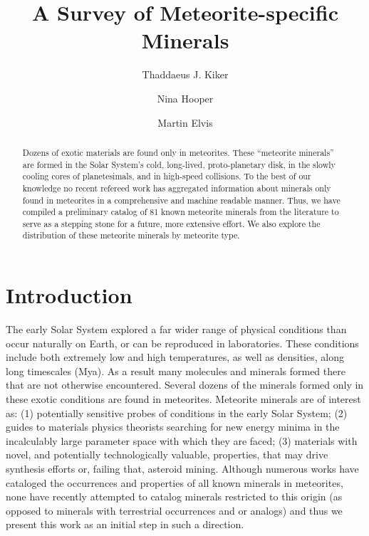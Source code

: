 \documentclass[]{aastex63}
\begin{document}
\title{A Survey of Meteorite-specific Minerals}

\author{Thaddaeus J. Kiker}

\author{Nina Hooper}

\author{Martin Elvis}



\begin{abstract}
Dozens of exotic materials are found only in meteorites. These “meteorite minerals” are formed in the Solar System’s cold, long-lived, proto-planetary disk, in the slowly cooling cores of planetesimals, and in high-speed collisions. To the best of our knowledge no recent refereed work has aggregated information about minerals only found in meteorites in a comprehensive and machine readable manner. Thus, we have compiled a preliminary catalog of 81 known meteorite minerals from the literature to serve as a stepping stone for a future, more extensive effort. We also explore the distribution of these meteorite minerals by meteorite type.  

\end{abstract}

\section{Introduction} \label{sec:intro}

The early Solar System explored a far wider range of physical conditions than occur naturally
on Earth, or can be reproduced in laboratories. These conditions include both extremely low and high temperatures, as well as densities, along long timescales (Mya). As
a result many molecules and minerals formed there that are not otherwise encountered. Several
dozens of the minerals formed only in these exotic conditions are found in meteorites. 
Meteorite minerals are of interest as: (1) potentially sensitive probes of conditions in the early Solar System; (2) guides to materials physics theorists searching for new energy minima in the
incalculably large parameter space with which they are faced; (3) materials with novel, and
potentially technologically valuable, properties, that may drive synthesis efforts or, failing that,
asteroid mining. Although numerous works \citep[e.g.][]{chiRubinReview2017, norton2008} have cataloged the occurrences and properties of all known minerals in meteorites, none have recently attempted to catalog minerals  restricted to this origin (as opposed to minerals with terrestrial occurrences and or analogs) and thus we present this work as an initial step in such a direction. 
\end{document}
